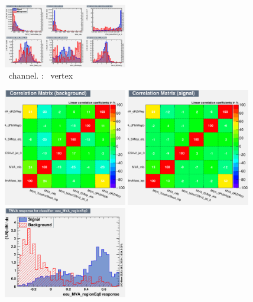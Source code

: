 \begin{figure}[htbp]
	\includegraphics[width=0.48\textwidth]{6_Search/Figures/MVAtechnics/singletopzct/eee/variables_id_c1.png}
	\caption{\eee\ channel. \STSR: \Zct\ vertex }
	\label{image:Figures3esingletopzct}
\end{figure}

\begin{figure}[htbp]
	\includegraphics[width=0.48\textwidth]{6_Search/Figures/MVAtechnics/singletopzct/eeu/CorrelationMatrixB.png}
	\includegraphics[width=0.48\textwidth]{6_Search/Figures/MVAtechnics/singletopzct/eeu/CorrelationMatrixS.png}
	\includegraphics[width=0.48\textwidth]{6_Search/Figures/MVAtechnics/singletopzct/eeu/mva_eeu_MVA_regionEq0.png}

\end{figure}
